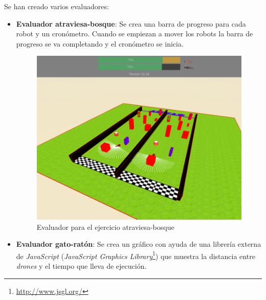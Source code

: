 Se han creado varios evaluadores: 
\begin{itemize}
    \item \textbf{Evaluador atraviesa-bosque}: Se crea una barra de progreso para cada robot y un cronómetro. Cuando se empiezan a mover los robots la barra de progreso se va completando y el cronómetro se inicia.
    
    \begin{figure}[H]
    \centering           
    \includegraphics[scale=0.3]{img/evaluador_forest.png}
    \caption{Evaluador para el ejercicio atraviesa-bosque}
    \label{fig:evaluador_bosque}
    \end{figure}

    \item \textbf{Evaluador gato-ratón}: Se crea un gráfico con ayuda de una librería externa de \textit{JavaScript} (\textit{JavaScript Graphics Library}\footnote{\url{http://www.jsgl.org/}}) que muestra la distancia entre \textit{drones} y el tiempo que lleva de ejecución.
    

\end{itemize}
